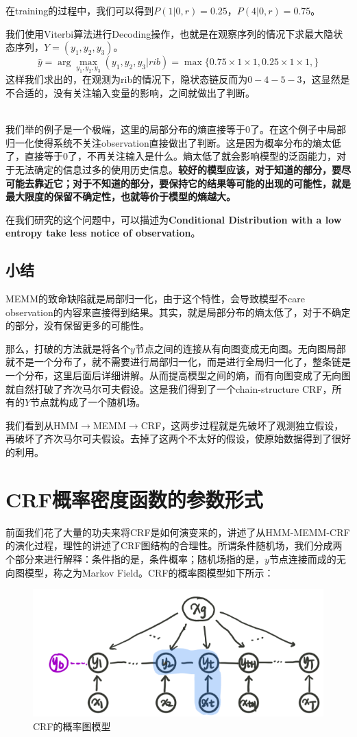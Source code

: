 \documentclass[a4paper]{article}
\begin{document}
在training的过程中，我们可以得到$P(1|0,r)=0.25$，$P(4|0,r)=0.75$。

我们使用Viterbi算法进行Decoding操作，也就是在观察序列的情况下求最大隐状态序列，$Y=(y_1,y_2,y_3)$。
\begin{equation*}
    \hat{y} = \arg\max_{y_1,y_2,y_3}(y_1,y_2,y_3|rib) = \max \{ 0.75\times 1 \times 1, 0.25\times 1 \times 1, \}
\end{equation*}
这样我们求出的，在观测为rib的情况下，隐状态链反而为$0-4-5-3$，这显然是不合适的，没有关注输入变量的影响，之间就做出了判断。

~\\
\qquad 我们举的例子是一个极端，这里的局部分布的熵直接等于0了。在这个例子中局部归一化使得系统不关注observation直接做出了判断。这是因为概率分布的熵太低了，直接等于0了，不再关注输入是什么。熵太低了就会影响模型的泛函能力，对于无法确定的信息过多的使用历史信息。\textbf{较好的模型应该，对于知道的部分，要尽可能去靠近它；对于不知道的部分，要保持它的结果等可能的出现的可能性，就是最大限度的保留不确定性，也就等价于模型的熵越大。}

在我们研究的这个问题中，可以描述为{\color{red}\textbf{Conditional Distribution with a low entropy take less notice of observation}}。

\subsection{小结}
MEMM的致命缺陷就是局部归一化，由于这个特性，会导致模型不care observation的内容来直接得到结果。其实，就是局部分布的熵太低了，对于不确定的部分，没有保留更多的可能性。

那么，打破的方法就是将各个$y$节点之间的连接从有向图变成无向图。无向图局部就不是一个分布了，就不需要进行局部归一化，而是进行全局归一化了，整条链是一个分布，这里后面后详细讲解。从而提高模型之间的熵，而有向图变成了无向图就自然打破了齐次马尔可夫假设。这是我们得到了一个chain-structure CRF，所有的$Y$节点就构成了一个随机场。

我们看到从HMM$\rightarrow$MEMM$\rightarrow$CRF，这两步过程就是先破坏了观测独立假设，再破坏了齐次马尔可夫假设。去掉了这两个不太好的假设，使原始数据得到了很好的利用。

\section{CRF概率密度函数的参数形式}
前面我们花了大量的功夫来将CRF是如何演变来的，讲述了从HMM-MEMM-CRF的演化过程，理性的讲述了CRF图结构的合理性。所谓条件随机场，我们分成两个部分来进行解释：条件指的是，条件概率；随机场指的是，$y$节点连接而成的无向图模型，称之为Markov Field。CRF的概率图模型如下所示：
\begin{figure}[H]
    \centering
    \includegraphics[width=.55\textwidth]{微信图片_20200223000157.png}
    \caption{CRF的概率图模型}
    \label{fig:my_label_1}
\end{figure}
\end{document}
